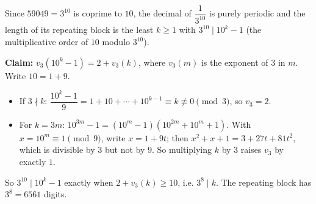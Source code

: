 Since $59049=3^{10}$ is coprime to $10$, the decimal of $\dfrac{1}{3^{10}}$ is purely periodic and the length of its repeating block is the least $k\ge1$ with $3^{10}\mid10^k-1$ (the multiplicative order of $10$ modulo $3^{10}$).

\textbf{Claim:} $v_3\left(10^k-1\right)=2+v_3(k)$, where $v_3(m)$ is the exponent of $3$ in $m$. Write $10=1+9$.
\begin{itemize}
\item If $3\nmid k$: $\dfrac{10^k-1}{9}=1+10+\cdots+10^{k-1}\equiv k\not\equiv0\pmod3$, so $v_3=2$.
\item For $k=3m$: $10^{3m}-1=\left(10^m-1\right)\left(10^{2m}+10^m+1\right)$. With $x=10^m\equiv1\pmod9$, write $x=1+9t$; then $x^2+x+1=3+27t+81t^2$, which is divisible by $3$ but not by $9$. So multiplying $k$ by $3$ raises $v_3$ by exactly $1$.
\end{itemize}
So $3^{10}\mid10^k-1$ exactly when $2+v_3(k)\ge10$, i.e. $3^8\mid k$. The repeating block has $3^8=\boxed{6561}$ digits.
